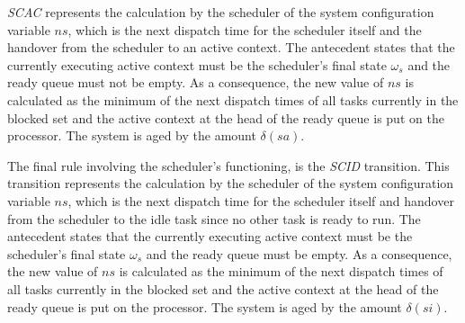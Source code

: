 
\emph{SCAC} represents the calculation by the scheduler of the system
configuration variable $ns$, which is the next dispatch time for the
scheduler itself and the handover from the scheduler to an active
context. The antecedent states that the currently executing active
context must be the scheduler's final state $\omega_s$ and the ready
queue must not be empty. As a consequence, the new value of $ns$ is
calculated as the minimum of the next dispatch times of all tasks
currently in the blocked set and the active context at the head of the
ready queue is put on the processor. The system is aged by the amount
$\delta(sa)$. 


The final rule involving the scheduler's functioning, is the
\emph{SCID} transition. This transition represents the calculation by
the scheduler of the system configuration variable $ns$, which is the
next dispatch time for the scheduler itself and handover from the
scheduler to the idle task since no other task is ready to run. The
antecedent states that the currently executing active context must be
the scheduler's final state $\omega_s$ and the ready queue must be
empty. As a consequence, the new value of $ns$ is calculated as the
minimum of the next dispatch times of all tasks currently in the
blocked set and the active context at the head of the ready queue is
put on the processor. The system is aged by the amount $\delta(si)$.


